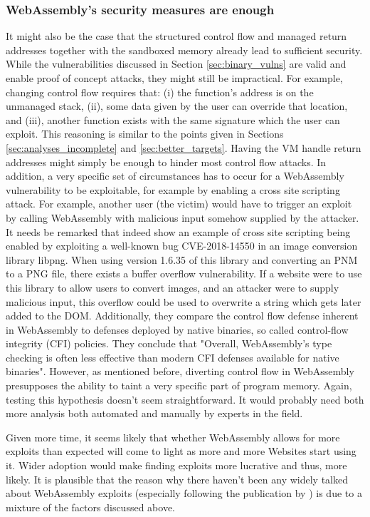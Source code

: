 \documentclass[sigconf]{acmart}
\begin{document}
\subsubsection{WebAssembly's security measures are enough}
\label{sec:wasm_sec_strong}
It might also be the case that the structured control flow and managed return addresses together with the sandboxed memory already lead to sufficient security. While the vulnerabilities discussed in Section \ref{sec:binary_vulns} are valid and enable proof of concept attacks, they might still be impractical. For example, changing control flow requires that: (i) the function's address is on the unmanaged stack, (ii), some data given by the user can override that location, and (iii), another function exists with the same signature which the user can exploit. This reasoning is similar to the points given in Sections \ref{sec:analyses_incomplete} and \ref{sec:better_targets}. Having the VM handle return addresses might simply be enough to hinder most control flow attacks. In addition, a very specific set of circumstances has to occur for a WebAssembly vulnerability to be exploitable, for example by enabling a cross site scripting attack. For example, another user (the victim) would have to trigger an exploit by calling WebAssembly with malicious input somehow supplied by the attacker. It needs be remarked that \citet{lehmann_everything_2020} indeed show an example of cross site scripting being enabled by exploiting a well-known bug CVE-2018-14550 in an image conversion library libpng. When using version 1.6.35 of this library and converting an PNM to a PNG file, there exists a buffer overflow vulnerability. If a website were to use this library to allow users to convert images, and an attacker were to supply malicious input, this overflow could be used to overwrite a string which gets later added to the DOM. Additionally, they compare the control flow defense inherent in WebAssembly to defenses deployed by native binaries, so called control-flow integrity (CFI) policies. They conclude that "Overall, WebAssembly’s type checking is often less effective than modern CFI defenses available for native binaries". However, as mentioned before, diverting control flow in WebAssembly presupposes the ability to taint a very specific part of program memory. Again, testing this hypothesis doesn't seem straightforward. It would probably need both more analysis both automated and manually by experts in the field.

Given more time, it seems likely that whether WebAssembly allows for more exploits than expected will come to light as more and more Websites start using it. Wider adoption would make finding exploits more lucrative and thus, more likely. It is plausible that the reason why there haven't been any widely talked about WebAssembly exploits (especially following the publication by \citet{lehmann_everything_2020}) is due to a mixture of the factors discussed above.
\end{document}
